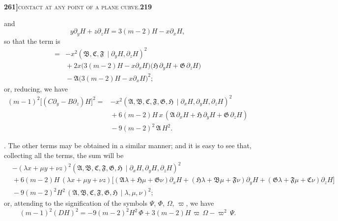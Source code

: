 \documentclass[11pt]{article}
\newcommand{\Cdel}{\mid}
\begin{document}
\newpage

\noindent\textbf{261]}\hfill\textsc{contact at any point of a plane curve.}\hfill\textbf{219}

\medskip

\noindent and
\[
y\partial_y H + z\partial_z H = 3(m-2)H - x\partial_x H,
\]
so that the term is
\[
\begin{aligned}
={}& -x^2(\mathfrak{B}, \mathfrak{C}, \mathfrak{F}\,\Cdel\partial_y H, \partial_z H)^2\\
&{}+ 2x\bigl(3(m-2)H - x\partial_x H\bigr)\!\bigl(\mathfrak{H}\,\partial_y H + \mathfrak{G}\,\partial_z H\bigr)\\
&{}- \mathfrak{A}\bigl(3(m-2)H - x\partial_x H\bigr)^2;
\end{aligned}
\]
or, reducing, we have
\[
\begin{aligned}
(m-1)^2\bigl[(C\partial_y - B\partial_z)H\bigr]^2 ={}& -x^2(\mathfrak{A}, \mathfrak{B}, \mathfrak{C}, \mathfrak{F}, \mathfrak{G}, \mathfrak{H}\,\Cdel\partial_x H, \partial_y H, \partial_z H)^2\\
&{}+ 6(m-2)H\,x\,(\mathfrak{A}\,\partial_x H + \mathfrak{H}\,\partial_y H + \mathfrak{G}\,\partial_z H)\\
&{}- 9(m-2)^2\,\mathfrak{A}\,H^2.
\end{aligned}
\]

\medskip

. The other terms may be obtained in a similar manner; and it is easy to see that, collecting all the terms, the sum will be
\[
\begin{aligned}
&-(\lambda x + \mu y + \nu z)^2(\mathfrak{A}, \mathfrak{B}, \mathfrak{C}, \mathfrak{F}, \mathfrak{G}, \mathfrak{H}\,\Cdel\partial_x H, \partial_y H, \partial_z H)^2\\
&{}+ 6(m-2)H\,(\lambda x + \mu y + \nu z)\bigl[(\mathfrak{A}\lambda + \mathfrak{H}\mu + \mathfrak{G}\nu)\partial_x H + (\mathfrak{H}\lambda + \mathfrak{B}\mu + \mathfrak{F}\nu)\partial_y H + (\mathfrak{G}\lambda + \mathfrak{F}\mu + \mathfrak{C}\nu)\partial_z H\bigr]\\
&{}- 9(m-2)^2 H^2\,(\mathfrak{A}, \mathfrak{B}, \mathfrak{C}, \mathfrak{F}, \mathfrak{G}, \mathfrak{H}\,\Cdel\lambda, \mu, \nu)^2;
\end{aligned}
\]
or, attending to the signification of the symbols $\Psi$, $\Phi$, $\Omega$, $\varpi$, we have
\[
(m-1)^2 (DH)^2 = -9(m-2)^2 H^2\,\Phi
   + 3(m-2)H\,\varpi\,\Omega - \varpi^2\,\Psi.
\]

\medskip
\end{document}
